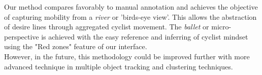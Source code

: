 Our method compares favorably to manual annotation and achieves the objective of capturing mobility
from a \textit{river} or 'birds-eye view'. This allows the abstraction of desire lines through aggregated cyclist movement. 
The \textit{ballet} or micro-perspective is achieved with the easy reference and 
inferring of cyclist mindset using the "Red zones" feature of our interface.
\ \\

However, in the future, this methodology could be improved further with more advanced technique in 
multiple object tracking and clustering techniques.